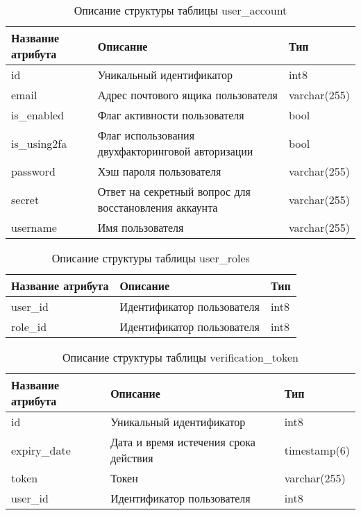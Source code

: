 \begin{table}[H]
  \caption{\onehalfspacing Описание структуры таблицы user_account}\label{database-table-user-account}
  \begin{tabular}{|p{6cm}|p{6cm}|p{4cm}|}
  \hline Название атрибута & Описание & Тип \\
  \hline id & Уникальный идентификатор & int8 \\
  \hline email & Адрес почтового ящика пользователя & varchar(255) \\
  \hline is_enabled & Флаг активности пользователя & bool \\
  \hline is_using2fa & Флаг использования двухфакторинговой авторизации & bool \\
  \hline password & Хэш пароля пользователя & varchar(255) \\
  \hline secret & Ответ на секретный вопрос для восстановления аккаунта & varchar(255) \\
  \hline username & Имя пользователя & varchar(255) \\
  \hline 
  \end{tabular}
\end{table}


\begin{table}[H]
  \caption{\onehalfspacing Описание структуры таблицы user_roles}\label{database-table-user-roles}
  \begin{tabular}{|p{6cm}|p{6cm}|p{4cm}|}
  \hline Название атрибута & Описание & Тип \\
  \hline user_id & Идентификатор пользователя & int8 \\
  \hline role_id & Идентификатор пользователя & int8 \\
  \hline 
  \end{tabular}
\end{table}


\begin{table}[H]
  \caption{\onehalfspacing Описание структуры таблицы verification_token}\label{database-table-verification-token}
  \begin{tabular}{|p{6cm}|p{6cm}|p{4cm}|}
  \hline Название атрибута & Описание & Тип \\
  \hline id & Уникальный идентификатор & int8 \\
  \hline expiry_date & Дата и время истечения срока действия & timestamp(6) \\
  \hline token & Токен & varchar(255) \\
  \hline user_id & Идентификатор пользователя & int8 \\
  \hline
  \end{tabular}
\end{table}

